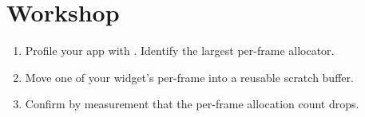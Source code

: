 \section*{Workshop}

\begin{enumerate}[leftmargin=*]
  \item Profile your app with . Identify
    the largest per-frame allocator.
  \item Move one of your widget's per-frame
     into a reusable scratch buffer.
  \item Confirm by measurement that the per-frame
    allocation count drops.
\end{enumerate}
